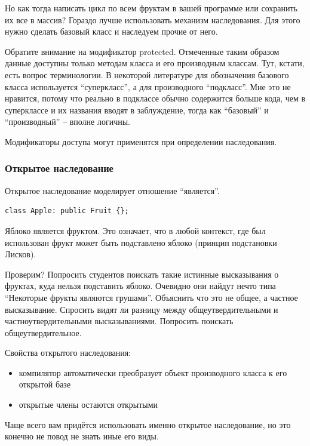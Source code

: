\documentclass[a4paper,12pt,oneside]{article}
\begin{document}
Но как тогда написать цикл по всем фруктам в вашей программе или сохранить их все в массив? Гораздо лучше использовать механизм наследования. Для этого нужно сделать базовый класс и наследуем прочие от него.



Обратите внимание на модификатор protected. Отмеченные таким образом данные доступны только методам класса и его производным классам. Тут, кстати, есть вопрос терминологии. В некоторой литературе для обозначения базового класса используется ``суперкласс'', а для производного ``подкласс''. Мне это не нравится, потому что реально в подклассе обычно содержится больше кода, чем в суперклассе и их названия вводят в заблуждение, тогда как ``базовый'' и ``производный'' – вполне логичны.

Модификаторы доступа могут применятся при определении наследования.

\subsubsection{Открытое наследование}

Открытое наследование моделирует отношение ``является''.

\begin{lstlisting}
class Apple: public Fruit {};
\end{lstlisting}

Яблоко является фруктом. Это означает, что в любой контекст, где был использован фрукт может быть подставлено яблоко (принцип подстановки Лисков).

Проверим? Попросить студентов поискать  такие истинные высказывания о фруктах, куда нельзя подставить яблоко. Очевидно они найдут нечто типа ``Некоторые фрукты являются грушами''. Объяснить что это не общее, а частное высказывание. Спросить видят ли разницу между общеутвердительными и частноутвердительными высказываниями. Попросить поискать общеутвердительное.

Свойства открытого наследования:
\begin{itemize}
\item
компилятор автоматически преобразует объект производного класса к его открытой базе
\item
открытые члены остаются открытыми
\end{itemize}

Чаще всего вам придётся использовать именно открытое наследование, но это конечно не повод не знать иные его виды.
\end{document}
